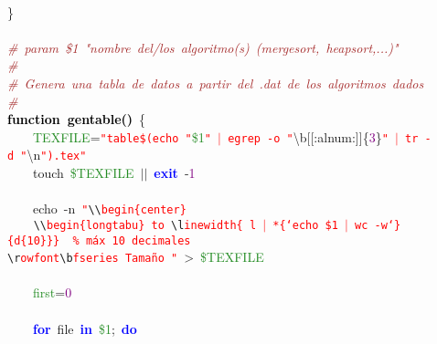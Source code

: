 \mbox{} \\
\mbox{}\} \\
\mbox{} \\
\mbox{}\textit{\textcolor{Brown}{\#\ param\ \$1\ "{}nombre\ del/los\ algoritmo(s)\ (mergesort,\ heapsort,...)"{}}} \\
\mbox{}\textit{\textcolor{Brown}{\#\ }} \\
\mbox{}\textit{\textcolor{Brown}{\#\ Genera\ una\ tabla\ de\ datos\ a\ partir\ del\ .dat\ de\ los\ algoritmos\ dados\ }} \\
\mbox{}\textit{\textcolor{Brown}{\#}} \\
\mbox{}\textbf{\textcolor{Black}{function\ gentable()}}\ \{ \\
\mbox{}\ \ \ \ \textcolor{ForestGreen}{TEXFILE}\textcolor{BrickRed}{=}\texttt{\textcolor{Red}{"{}table\$(echo\ "{}}}\textcolor{ForestGreen}{\$1}\texttt{\textcolor{Red}{"{}\ $|$\ egrep\ -o\ "{}}}\textcolor{BrickRed}{\textbackslash{}}b\textcolor{BrickRed}{[[:}alnum\textcolor{BrickRed}{:]]}\{\textcolor{Purple}{3}\}\texttt{\textcolor{Red}{"{}\ $|$\ tr\ -d\ "{}}}\textcolor{BrickRed}{\textbackslash{}}n\texttt{\textcolor{Red}{"{}).tex"{}}} \\
\mbox{}\ \ \ \ touch\ \textcolor{ForestGreen}{\$TEXFILE}\ \textcolor{BrickRed}{$|$$|$}\ \textbf{\textcolor{Blue}{exit}}\ -\textcolor{Purple}{1} \\
\mbox{} \\
\mbox{}\ \ \ \ echo\ -n\ \texttt{\textcolor{Red}{"{}}}\texttt{\textcolor{CarnationPink}{\textbackslash{}\textbackslash{}}}\texttt{\textcolor{Red}{begin\{center\}}} \\
\mbox{}\texttt{\textcolor{Red}{\ \ \ \ }}\texttt{\textcolor{CarnationPink}{\textbackslash{}\textbackslash{}}}\texttt{\textcolor{Red}{begin\{longtabu\}\ to\ }}\texttt{\textcolor{CarnationPink}{\textbackslash{}l}}\texttt{\textcolor{Red}{inewidth\{\ l\ $|$\ *\{`echo\ \$1\ $|$\ wc\ -w`\}\{d\{10\}\}\}\ \ \%\ máx\ 10\ decimales}} \\
\mbox{}\texttt{\textcolor{CarnationPink}{\textbackslash{}r}}\texttt{\textcolor{Red}{owfont}}\texttt{\textcolor{CarnationPink}{\textbackslash{}b}}\texttt{\textcolor{Red}{fseries\ Tamaño\ "{}}}\ \textcolor{BrickRed}{\textgreater{}}\ \textcolor{ForestGreen}{\$TEXFILE} \\
\mbox{} \\
\mbox{}\ \ \ \ \textcolor{ForestGreen}{first}\textcolor{BrickRed}{=}\textcolor{Purple}{0} \\
\mbox{} \\
\mbox{}\ \ \ \ \textbf{\textcolor{Blue}{for}}\ file\ \textbf{\textcolor{Blue}{in}}\ \textcolor{ForestGreen}{\$1}\textcolor{BrickRed}{;}\ \textbf{\textcolor{Blue}{do}} \\
